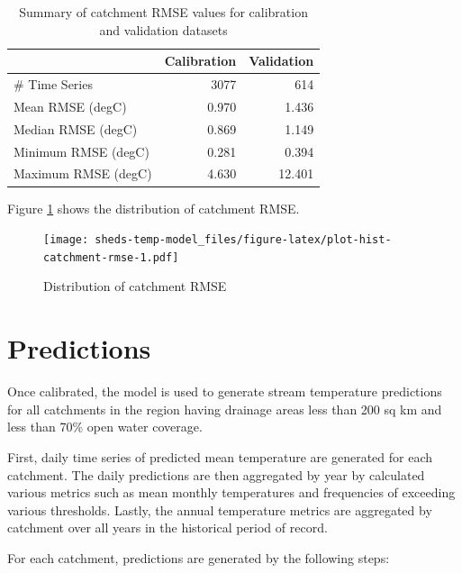 \documentclass[]{book}
\begin{document}
\begin{table}

\caption{\label{tab:table-gof-catchment}Summary of catchment RMSE values for calibration and validation datasets}
\centering
\begin{tabular}[t]{l|r|r}
\hline
 & Calibration & Validation\\
\hline
\# Time Series & 3077 & 614\\
\hline
Mean RMSE (degC) & 0.970 & 1.436\\
\hline
Median RMSE (degC) & 0.869 & 1.149\\
\hline
Minimum RMSE (degC) & 0.281 & 0.394\\
\hline
Maximum RMSE (degC) & 4.630 & 12.401\\
\hline
\end{tabular}
\end{table}

Figure \ref{fig:plot-hist-catchment-rmse} shows the distribution of catchment RMSE.

\begin{figure}
\centering
\texttt{[image: sheds-temp-model\_files/figure-latex/plot-hist-catchment-rmse-1.pdf]}
\caption{\label{fig:plot-hist-catchment-rmse}Distribution of catchment RMSE}
\end{figure}

\hypertarget{predictions}{%
\chapter{Predictions}\label{predictions}}

Once calibrated, the model is used to generate stream temperature predictions for all catchments in the region having drainage areas less than 200 sq km and less than 70\% open water coverage.

First, daily time series of predicted mean temperature are generated for each catchment. The daily predictions are then aggregated by year by calculated various metrics such as mean monthly temperatures and frequencies of exceeding various thresholds. Lastly, the annual temperature metrics are aggregated by catchment over all years in the historical period of record.

For each catchment, predictions are generated by the following steps:
\end{document}

